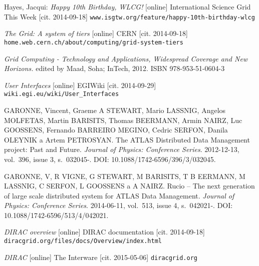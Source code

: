 
\def\bibname{Bibliography}
\begin{thebibliography}{99}
\addcontentsline{toc}{chapter}{\bibname}


	Hayes, Jacqui: 
	\emph{Happy 10th Birthday, WLCG!} [online]
	International Science Grid This Week [cit. 2014-09-18]
	\texttt{www.isgtw.org/feature/happy-10th-birthday-wlcg}

	\emph{The Grid: A system of tiers} [online] 
	CERN [cit. 2014-09-18]
	\texttt{home.web.cern.ch/about/computing/grid-system-tiers}

	\emph{Grid Computing - Technology and Applications, Widespread Coverage and New Horizons.} 
	edited by Maad, Soha; InTech, 2012.
	ISBN 978-953-51-0604-3

	\emph{User Interfaces} [online] 
	EGIWiki [cit. 2014-09-29]
	\texttt{wiki.egi.eu/wiki/User\_Interfaces}
	
	GARONNE, Vincent, Graeme A STEWART, Mario LASSNIG, Angelos MOLFETAS, Martin BARISITS, Thomas BEERMANN, 
	Armin NAIRZ, Luc GOOSSENS, Fernando BARREIRO MEGINO, Cedric SERFON, Danila OLEYNIK a Artem PETROSYAN. 
	The ATLAS Distributed Data Management project: Past and Future. 
	\textit{Journal of Physics: Conference Series}. 2012-12-13, vol.~396, issue 3, s.~032045-. 
	DOI: 10.1088/1742-6596/396/3/032045. 
	
	GARONNE, V, R VIGNE, G STEWART, M BARISITS, T B EERMANN, M LASSNIG, C SERFON, L GOOSSENS a A NAIRZ. 
	Rucio – The next generation of large scale distributed system for ATLAS Data Management. 
	\textit{Journal of Physics: Conference Series}. 2014-06-11, vol.~513, issue 4, s.~042021-. 
	DOI: 10.1088/1742-6596/513/4/042021.

	\emph{DIRAC overview} [online] 
	DIRAC documentation [cit. 2014-09-18]
	\texttt{diracgrid.org/files/docs/Overview/index.html}
	
	\emph{DIRAC} [online] 
	The Interware [cit. 2015-05-06]
	\texttt{diracgrid.org}
		

\end{thebibliography}
